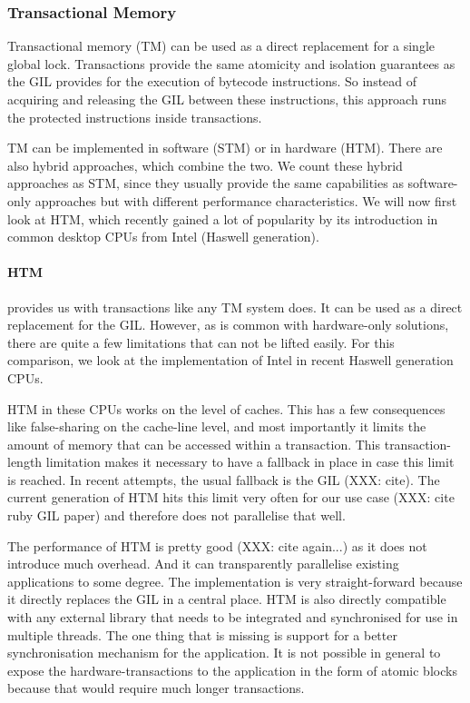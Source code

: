 \documentclass{sigplanconf}
\begin{document}


\subsubsection{Transactional Memory}
Transactional memory (TM) can be used as a direct replacement for a
single global lock. Transactions provide the same atomicity and
isolation guarantees as the GIL provides for the execution of bytecode
instructions. So instead of acquiring and releasing the GIL between
these instructions, this approach runs the protected instructions
inside transactions.

TM can be implemented in software (STM) or in hardware (HTM). There
are also hybrid approaches, which combine the two. We count these
hybrid approaches as STM, since they usually provide the same
capabilities as software-only approaches but with different
performance characteristics. We will now first look at HTM, which
recently gained a lot of popularity by its introduction in common
desktop CPUs from Intel (Haswell generation).

\paragraph{HTM} provides us with transactions like any TM system does. It can
be used as a direct replacement for the GIL. However, as is common
with hardware-only solutions, there are quite a few limitations
that can not be lifted easily. For this comparison, we look at
the implementation of Intel in recent Haswell generation CPUs.

HTM in these CPUs works on the level of caches. This has a few
consequences like false-sharing on the cache-line level, and most
importantly it limits the amount of memory that can be accessed within
a transaction. This transaction-length limitation makes it necessary
to have a fallback in place in case this limit is reached. In recent
attempts, the usual fallback is the GIL (XXX: cite). The current
generation of HTM hits this limit very often for our use case (XXX:
cite ruby GIL paper) and therefore does not parallelise that well.

The performance of HTM is pretty good (XXX: cite again...) as it does
not introduce much overhead. And it can transparently parallelise
existing applications to some degree. The implementation is very
straight-forward because it directly replaces the GIL in a central
place. HTM is also directly compatible with any external library that
needs to be integrated and synchronised for use in multiple
threads. The one thing that is missing is support for a better
synchronisation mechanism for the application. It is not possible
in general to expose the hardware-transactions to the application
in the form of atomic blocks because that would require much
longer transactions.
\end{document}
